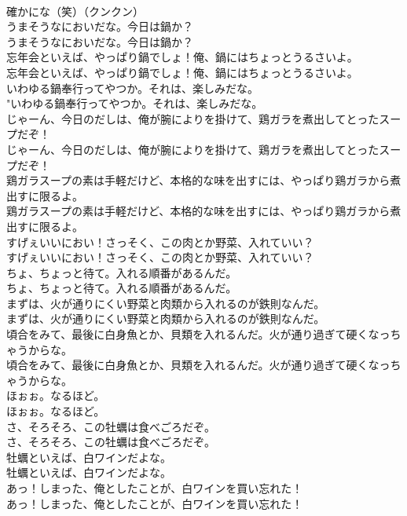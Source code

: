\documentclass[8pt]{extreport}
\begin{document}
\begin{CJK}{UTF8}{min}
\\	確かにな（笑）（クンクン） 
\\	うまそうなにおいだな。今日は鍋か？	
\\	うまそうなにおいだな。今日は鍋か？ 
\\	忘年会といえば、やっぱり鍋でしょ！俺、鍋にはちょっとうるさいよ。	
\\	忘年会といえば、やっぱり鍋でしょ！俺、鍋にはちょっとうるさいよ。 
\\	いわゆる鍋奉行ってやつか。それは、楽しみだな。	
\\	"いわゆる鍋奉行ってやつか。それは、楽しみだな。 
\\	じゃーん、今日のだしは、俺が腕によりを掛けて、鶏ガラを煮出してとったスープだぞ！	
\\	じゃーん、今日のだしは、俺が腕によりを掛けて、鶏ガラを煮出してとったスープだぞ！ 
\\	鶏ガラスープの素は手軽だけど、本格的な味を出すには、やっぱり鶏ガラから煮出すに限るよ。	
\\	鶏ガラスープの素は手軽だけど、本格的な味を出すには、やっぱり鶏ガラから煮出すに限るよ。 
\\	すげぇいいにおい！さっそく、この肉とか野菜、入れていい？	
\\	すげぇいいにおい！さっそく、この肉とか野菜、入れていい？ 
\\	ちょ、ちょっと待て。入れる順番があるんだ。	
\\	ちょ、ちょっと待て。入れる順番があるんだ。 
\\	まずは、火が通りにくい野菜と肉類から入れるのが鉄則なんだ。	
\\	まずは、火が通りにくい野菜と肉類から入れるのが鉄則なんだ。 
\\	頃合をみて、最後に白身魚とか、貝類を入れるんだ。火が通り過ぎて硬くなっちゃうからな。	
\\	頃合をみて、最後に白身魚とか、貝類を入れるんだ。火が通り過ぎて硬くなっちゃうからな。 
\\	ほぉぉ。なるほど。	
\\	ほぉぉ。なるほど。 
\\	さ、そろそろ、この牡蠣は食べごろだぞ。	
\\	さ、そろそろ、この牡蠣は食べごろだぞ。 
\\	牡蠣といえば、白ワインだよな。	
\\	牡蠣といえば、白ワインだよな。 
\\	あっ！しまった、俺としたことが、白ワインを買い忘れた！	
\\	あっ！しまった、俺としたことが、白ワインを買い忘れた！ 

\end{CJK}
\end{document}
